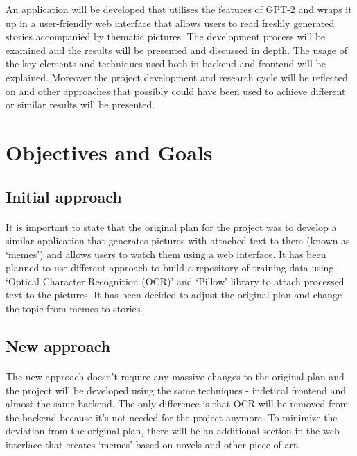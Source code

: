 \documentclass[12pt]{report}
\begin{document}
An application will be developed that utilises the features of GPT-2 and wraps it up in a user-friendly web
interface that allows users to read freshly generated stories accompanied by thematic pictures. The development process 
will be examined and the results will be presented and discussed in depth. The usage of the key elements and techniques used both in
backend and frontend will be explained. Moreover the project development and research cycle will be reflected on and 
other approaches that possibly could have been used to achieve different or similar results will be presented.

\clearpage

\section*{Objectives and Goals}

\subsection*{Initial approach}
\paragraph{}
It is important to state that the original plan for the project was to develop a similar application that generates
pictures with attached text to them (known as `memes') and allows users to watch them using a web interface. It has been
planned to use different approach to build a repository of training data using `Optical Character Recognition (OCR)' \citep{tesseract_article} and 
`Pillow' library to attach processed text to the pictures. It has been decided to adjust the original plan and change the
topic from memes to stories.

\subsection*{New approach}
\paragraph{}
The new approach doesn't require any massive changes to the original plan and the project will be developed using the same
techniques - indetical frontend and almost the same backend. The only difference is that OCR will be removed from the backend
because it's not needed for the project anymore. To minimize the deviation from the original plan, there will be an
additional section in the web interface that creates `memes' based on novels and other piece of art.
\end{document}
